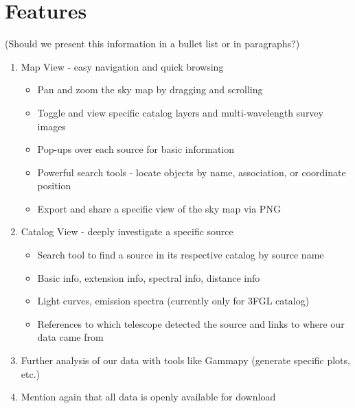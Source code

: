 \renewcommand{\thefootnote}{\fnsymbol{footnote}}


\section{Features}

(Should we present this information in a bullet list or in paragraphs?)

\begin{enumerate}

\item Map View - easy navigation and quick browsing

  \begin{itemize}

  \item Pan and zoom the sky map by dragging and scrolling

  \item Toggle and view specific catalog layers and multi-wavelength survey images

  \item Pop-ups over each source for basic information

  \item Powerful search tools - locate objects by name, association, or coordinate position

  \item Export and share a specific view of the sky map via PNG

  \end{itemize}


\item Catalog View - deeply investigate a specific source

  \begin{itemize}

  \item Search tool to find a source in its respective catalog by source name

  \item Basic info, extension info, spectral info, distance info

  \item Light curves, emission spectra (currently only for 3FGL catalog)

  \item References to which telescope detected the source and links to where our data came from

  \end{itemize}


\item Further analysis of our data with tools like Gammapy (generate specific plots, etc.)

\item Mention again that all data is openly available for download

\end{enumerate}

